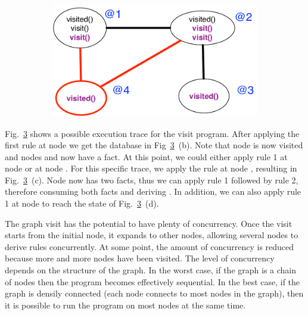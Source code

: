 \begin{figure}[h]
\begin{subfigure}[b]{0.45\textwidth}
                \label{fig:exec_trace3}
        \end{subfigure}%
        ~ %
        \begin{subfigure}[b]{0.45\textwidth}
                  \includegraphics[width=\textwidth]{figures/visit/trace4}


                  \label{fig:exec_trace4}
          \end{subfigure}
        \label{fig:exec_trace}
\end{figure}

Fig.~\ref{fig:exec_trace} shows a possible execution trace for the visit
program. After applying the first rule at node  we get the database in
Fig~\ref{fig:exec_trace}~(b).  Note that node  is now visited and nodes
 and  now have a  fact. At this point, we could
either apply rule 1 at node  or at node .  For this specific
trace, we apply the rule at node , resulting in
Fig.~\ref{fig:exec_trace}~(c). Node  now has two  facts,
thus we can apply rule 1 followed by rule 2, therefore consuming both
 facts and deriving . In addition, we can also apply
rule 1 at node  to reach the state of Fig.~\ref{fig:exec_trace}~(d).

The graph visit has the potential to have plenty of concurrency. Once the visit
starts from the initial node, it expands to other nodes, allowing several nodes
to derive rules concurrently. At some point, the amount of concurrency is
reduced because more and more nodes have been visited. The level of concurrency
depends on the structure of the graph. In the worst case, if the graph is a
chain of nodes then the program becomes effectively sequential.  In the best
case, if the graph is densily connected (each node connects to most nodes in the
graph), then it is possible to run the program on most nodes at the same time.

